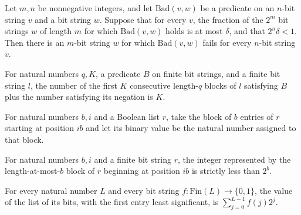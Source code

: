 \begin{theorem}
\label{Randomized.exists_forall_not_of_randProb_le}
\leanok
{}
Let $m,n$ be nonnegative integers, and let $\mathrm{Bad}(v,w)$ be a predicate on an
$n$-bit string $v$ and a bit string $w$. Suppose that for every $v$, the fraction of the
$2^m$ bit strings $w$ of length $m$ for which $\mathrm{Bad}(v,w)$ holds is at most
$\delta$, and that $2^n\delta<1$. Then there is an $m$-bit string $w$ for which
$\mathrm{Bad}(v,w)$ fails for every $n$-bit string $v$.
\end{theorem}

\begin{theorem}
\label{Randomized.blockCount_add_not}
\leanok
{}
For natural numbers $q,K$, a predicate $B$ on finite bit strings, and a finite bit
string $l$, the number of the first $K$ consecutive length-$q$ blocks of $l$ satisfying
$B$ plus the number satisfying its negation is $K$.
\end{theorem}

\begin{definition}
\label{Randomized.blockVal}
\leanok
{}
For natural numbers $b,i$ and a Boolean list $r$, take the block of $b$ entries of $r$
starting at position $i b$ and let its binary value be the natural number assigned to
that block.
\end{definition}

\begin{theorem}
\label{Randomized.blockVal_lt}
\leanok
{}
For natural numbers $b,i$ and a finite bit string $r$, the integer represented by the
length-at-most-$b$ block of $r$ beginning at position $ib$ is strictly less than $2^b$.
\end{theorem}

\begin{theorem}
\label{Randomized.bitsVal_ofFn}
\leanok
{}
For every natural number $L$ and every bit string $f : \mathrm{Fin}(L) \to \{0,1\}$, the
value of the list of its bits, with the first entry least significant, is
$\sum_{j=0}^{L-1} f(j)2^j$.
\end{theorem}

